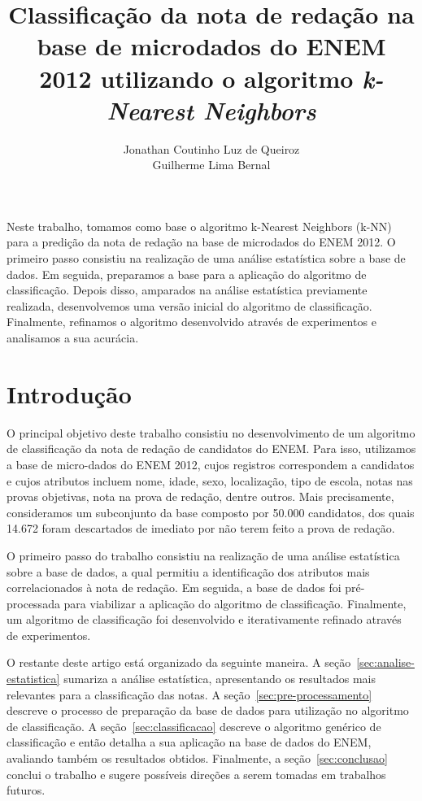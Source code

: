 \documentclass[12pt]{article}
\title{Classificação da nota de redação na base de microdados do ENEM 2012 utilizando o algoritmo \emph{k-Nearest Neighbors}}
\author{Jonathan Coutinho Luz de Queiroz\inst{1} \\ Guilherme Lima Bernal\inst{1}}
\begin{document}
\maketitle

\begin{resumo}
Neste trabalho, tomamos como base o algoritmo k-Nearest Neighbors (k-NN) para a predição da nota de redação na base de microdados do ENEM 2012.
O primeiro passo consistiu na realização de uma análise estatística sobre a base de dados.
Em seguida, preparamos a base para a aplicação do algoritmo de classificação.
Depois disso, amparados na análise estatística previamente realizada, desenvolvemos uma versão inicial do algoritmo de classificação.
Finalmente, refinamos o algoritmo desenvolvido através de experimentos e analisamos a sua acurácia.
\end{resumo}

\section{Introdução}
\label{sec:intro}
O principal objetivo deste trabalho consistiu no desenvolvimento de um algoritmo de classificação da nota de redação de candidatos do ENEM.
Para isso, utilizamos a base de micro-dados do ENEM 2012, cujos registros correspondem a candidatos e cujos atributos incluem nome, idade, sexo, localização, tipo de escola, notas nas provas objetivas, nota na prova de redação, dentre outros.
Mais precisamente, consideramos um subconjunto da base composto por 50.000 candidatos, dos quais 14.672 foram descartados de imediato por não terem feito a prova de redação.

O primeiro passo do trabalho consistiu na realização de uma análise estatística sobre a base de dados, a qual permitiu a identificação dos atributos mais correlacionados à nota de redação.
Em seguida, a base de dados foi pré-processada para viabilizar a aplicação do algoritmo de classificação.
Finalmente, um algoritmo de classificação foi desenvolvido e iterativamente refinado através de experimentos.

O restante deste artigo está organizado da seguinte maneira.
A seção~\ref{sec:analise-estatistica} sumariza a análise estatística, apresentando os resultados mais relevantes para a classificação das notas.
A seção~\ref{sec:pre-processamento} descreve o processo de preparação da base de dados para utilização no algoritmo de classificação.
A seção~\ref{sec:classificacao} descreve o algoritmo genérico de classificação e então detalha a sua aplicação na base de dados do ENEM, avaliando também os resultados obtidos.
Finalmente, a seção~\ref{sec:conclusao} conclui o trabalho e sugere possíveis direções a serem tomadas em trabalhos futuros.
\end{document}
